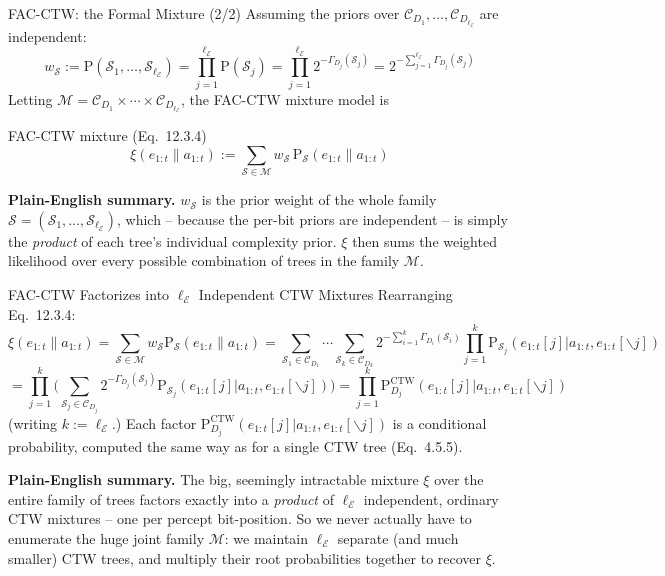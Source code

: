 \documentclass[aspectratio=169,10pt]{beamer}
\newcommand{\Ecal}{\mathcal{E}}
\newcommand{\Mcal}{\mathcal{M}}
\newcommand{\Scal}{\mathcal{S}}
\newcommand{\CDi}[1]{\mathcal{C}_{D_{#1}}}
\begin{document}
\begin{frame}{FAC-CTW: the Formal Mixture (2/2)}
\small
Assuming the priors over $\CDi{1},\ldots,\CDi{\ell_\Ecal}$ are independent:
$$w_\Scal := \mathrm{P}(\Scal_1,\ldots,\Scal_{\ell_\Ecal}) = \prod_{j=1}^{\ell_\Ecal}
\mathrm{P}(\Scal_j) = \prod_{j=1}^{\ell_\Ecal} 2^{-\Gamma_{D_j}(\Scal_j)} =
2^{-\sum_{j=1}^{\ell_\Ecal}\Gamma_{D_j}(\Scal_j)}$$
Letting $\Mcal=\CDi{1}\times\cdots\times\CDi{\ell_\Ecal}$, the FAC-CTW mixture model is
\begin{block}{FAC-CTW mixture (Eq.\ 12.3.4)}
$$\xi(e_{1:t}\|a_{1:t}) := \sum_{\Scal\in\Mcal} w_\Scal\, \mathrm{P}_\Scal(e_{1:t}\|a_{1:t})$$
\end{block}
\textbf{Plain-English summary.} $w_\Scal$ is the prior weight of the whole family
$\Scal=(\Scal_1,\ldots,\Scal_{\ell_\Ecal})$, which -- because the per-bit priors are
independent -- is simply the \emph{product} of each tree's individual complexity prior.
$\xi$ then sums the weighted likelihood over every possible combination of trees in the
family $\Mcal$.
\end{frame}

\begin{frame}{FAC-CTW Factorizes into $\ell_\Ecal$ Independent CTW Mixtures}
Rearranging Eq.\ 12.3.4:
$$\xi(e_{1:t}\|a_{1:t}) = \sum_{\Scal\in\Mcal} w_\Scal \mathrm{P}_\Scal(e_{1:t}\|a_{1:t})
= \sum_{\Scal_1\in\CDi{1}}\!\cdots\!\sum_{\Scal_k\in\CDi{k}}
2^{-\sum_{i=1}^k\Gamma_{D_i}(\Scal_i)}\prod_{j=1}^k \mathrm{P}_{\Scal_j}(e_{1:t}[j]|a_{1:t},e_{1:t}[\backslash j])$$
$$= \prod_{j=1}^k\Big(\sum_{\Scal_j\in\CDi{j}} 2^{-\Gamma_{D_j}(\Scal_j)}
\mathrm{P}_{\Scal_j}(e_{1:t}[j]|a_{1:t},e_{1:t}[\backslash j])\Big)
= \prod_{j=1}^k \mathrm{P}_{D_j}^{\mathrm{CTW}}(e_{1:t}[j]|a_{1:t},e_{1:t}[\backslash j])$$
(writing $k:=\ell_\Ecal$.) Each factor $\mathrm{P}_{D_j}^{\mathrm{CTW}}(e_{1:t}[j]|
a_{1:t},e_{1:t}[\backslash j])$ is a conditional probability, computed the same way as for
a single CTW tree (Eq.\ 4.5.5).

\textbf{Plain-English summary.} The big, seemingly intractable mixture $\xi$ over the
entire family of trees factors exactly into a \emph{product} of $\ell_\Ecal$ independent,
ordinary CTW mixtures -- one per percept bit-position. So we never actually have to
enumerate the huge joint family $\Mcal$: we maintain $\ell_\Ecal$ separate (and much
smaller) CTW trees, and multiply their root probabilities together to recover $\xi$.
\end{frame}
\end{document}

